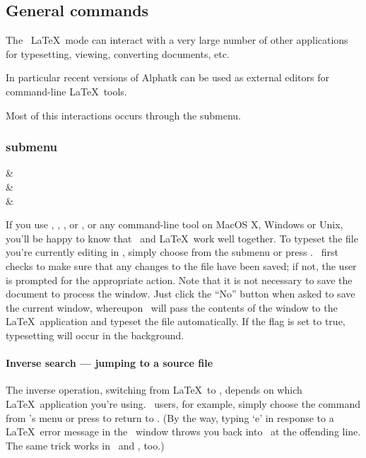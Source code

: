 \documentclass{report}
\begin{document}
\subsection{General commands}

The \Alpha\ \LaTeX\ mode can interact with a very large number of
other applications for typesetting, viewing, converting documents, etc.

In particular recent versions of Alphatk can be used as external
editors for command-line \LaTeX\ tools.

Most of this interactions occurs through the  submenu.

\subsubsection{ submenu}

\begin{commands}
	 &  \\
	 &  \\
	 & 
\end{commands}
If you use \Textures, \OzTeX, \CMacTeX, or \DirectTeX, or any
command-line tool on MacOS X, Windows or Unix, you'll be happy 
to know that \Alpha\ and \LaTeX\ work well together.  To typeset the 
file you're currently editing in \Alpha, simply choose  
from the  submenu or press .  \Alpha\ first 
checks to make sure that any changes to the file have been saved; if 
not, the user is prompted for the appropriate action.  Note that it is 
not necessary to save the document to process the window.  Just click 
the ``No'' button when asked to save the current window, whereupon 
\Alpha\ will pass the contents of the window to the \LaTeX\ 
application and typeset the file automatically.  If the flag 
 is set to true, typesetting will occur in the 
background.

\paragraph{Inverse search --- jumping to a source file}

The inverse operation, switching from \LaTeX\ to \Alpha, depends on 
which \LaTeX\ application you're using.  \OzTeX\ users, for example, 
simply choose the \acmd{Edit} command from \OzTeX's \amenu{Edit} menu 
or press \key{Cmd E} to return to \Alpha.  (By the way, typing `e' in 
response to a \LaTeX\ error message in the \OzTeX\ window throws you 
back into \Alpha\ at the offending line.  The same trick works in 
\CMacTeX\ and \DirectTeX, too.)
\end{document}
